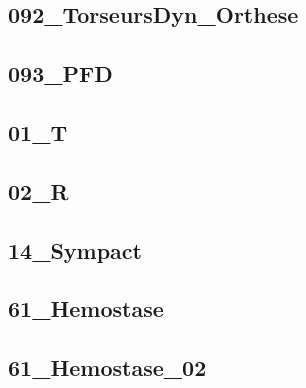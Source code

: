 \subsection{092\_TorseursDyn\_Orthese}
\graphicspath{{../11-Actions Mécaniques/TD/DYN/092_TorseursDyn_Orthese/images/}{../11-Actions Mécaniques/TD/DYN/092_TorseursDyn_Orthese/}{../Style/png/}}


\subsection{093\_PFD}
\graphicspath{{../11-Actions Mécaniques/TD/DYN/093_PFD/images/}{../11-Actions Mécaniques/TD/DYN/093_PFD/}{../Style/png/}}


\subsection{01\_T}
\graphicspath{{../11-Actions Mécaniques/TD/DYN/DYN-01/01_T/images/}{../11-Actions Mécaniques/TD/DYN/DYN-01/01_T/}{../Style/png/}}


\subsection{02\_R}
\graphicspath{{../11-Actions Mécaniques/TD/DYN/DYN-01/02_R/images/}{../11-Actions Mécaniques/TD/DYN/DYN-01/02_R/}{../Style/png/}}


\subsection{14\_Sympact}
\graphicspath{{../11-Actions Mécaniques/TD/DYN/DYN-01/14_Sympact/images/}{../11-Actions Mécaniques/TD/DYN/DYN-01/14_Sympact/}{../Style/png/}}


\subsection{61\_Hemostase}
\graphicspath{{../11-Actions Mécaniques/TD/DYN/DYN-01/61_Hemostase/images/}{../11-Actions Mécaniques/TD/DYN/DYN-01/61_Hemostase/}{../Style/png/}}


\subsection{61\_Hemostase\_02}
\graphicspath{{../11-Actions Mécaniques/TD/DYN/DYN-01/61_Hemostase_02/images/}{../11-Actions Mécaniques/TD/DYN/DYN-01/61_Hemostase_02/}{../Style/png/}}


